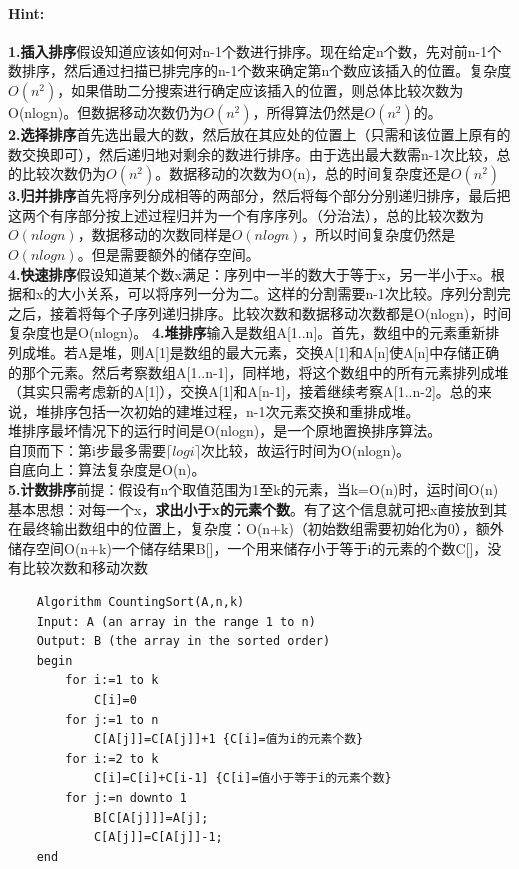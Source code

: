 \documentclass{article}
\begin{document}
     \paragraph{Hint:}\textbf{1.插入排序}假设知道应该如何对n-1个数进行排序。现在给定n个数，先对前n-1个数排序，然后通过扫描已排完序的n-1个数来确定第n个数应该插入的位置。复杂度$O(n^2)$，如果借助二分搜索进行确定应该插入的位置，则总体比较次数为O(nlogn)。但数据移动次数仍为$O(n^2)$，所得算法仍然是$O(n^2)$的。\\
     \textbf{2.选择排序}首先选出最大的数，然后放在其应处的位置上（只需和该位置上原有的数交换即可），然后递归地对剩余的数进行排序。由于选出最大数需n-1次比较，总的比较次数仍为$O(n^2)$。数据移动的次数为O(n)，总的时间复杂度还是$O(n^2)$\\
      \textbf{3.归并排序}首先将序列分成相等的两部分，然后将每个部分分别递归排序，最后把这两个有序部分按上述过程归并为一个有序序列。（分治法），总的比较次数为$O(nlogn)$，数据移动的次数同样是$O(nlogn)$，所以时间复杂度仍然是$O(nlogn)$。但是需要额外的储存空间。\\
       \textbf{4.快速排序}假设知道某个数x满足：序列中一半的数大于等于x，另一半小于x。根据和x的大小关系，可以将序列一分为二。这样的分割需要n-1次比较。序列分割完之后，接着将每个子序列递归排序。比较次数和数据移动次数都是O(nlogn)，时间复杂度也是O(nlogn)。
       \textbf{4.堆排序}输入是数组A[1..n]。首先，数组中的元素重新排列成堆。若A是堆，则A[1]是数组的最大元素，交换A[1]和A[n]使A[n]中存储正确的那个元素。然后考察数组A[1..n-1]，同样地，将这个数组中的所有元素排列成堆（其实只需考虑新的A[1]），交换A[1]和A[n-1]，接着继续考察A[1..n-2]。总的来说，堆排序包括一次初始的建堆过程，n-1次元素交换和重排成堆。\\
       堆排序最坏情况下的运行时间是O(nlogn)，是一个原地置换排序算法。\\
       自顶而下：第i步最多需要$\lceil logi \rceil$次比较，故运行时间为O(nlogn)。\\
       自底向上：算法复杂度是O(n)。\\
       \textbf{5.计数排序}前提：假设有n个取值范围为1至k的元素，当k=O(n)时，运时间O(n)\\
       基本思想：对每一个x，\textbf{求出小于x的元素个数}。有了这个信息就可把x直接放到其在最终输出数组中的位置上，复杂度：O(n+k)（初始数组需要初始化为0），额外储存空间O(n+k)一个储存结果B[]，一个用来储存小于等于i的元素的个数C[]，没有比较次数和移动次数\\
        \lstset{language=C}
    \begin{lstlisting}
    Algorithm CountingSort(A,n,k)
    Input: A (an array in the range 1 to n)
    Output: B (the array in the sorted order) 
    begin
        for i:=1 to k
            C[i]=0 
        for j:=1 to n
            C[A[j]]=C[A[j]]+1 {C[i]=值为i的元素个数}
        for i:=2 to k
            C[i]=C[i]+C[i-1] {C[i]=值小于等于i的元素个数}
        for j:=n downto 1
            B[C[A[j]]]=A[j]; 
            C[A[j]]=C[A[j]]-1; 
    end

    \end{lstlisting}
\end{document}

